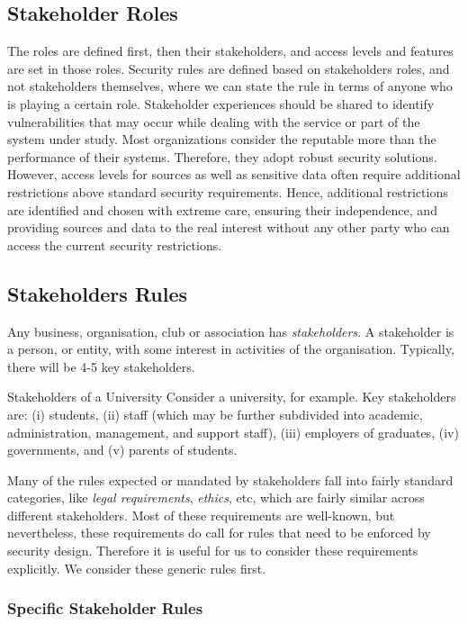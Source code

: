 \subsection{Stakeholder Roles}\label{strol}
The roles are defined first, then their stakeholders, and access levels and features are set in those roles. Security rules are defined based on stakeholders roles, and not stakeholders themselves, where we can state the rule in terms of anyone who is playing a certain role. Stakeholder experiences should be shared to identify vulnerabilities that may occur while dealing with the service or part of the system under study. Most organizations consider the reputable more than the performance of their systems. Therefore, they adopt robust security solutions. However, access levels for sources as well as sensitive data often require additional restrictions above standard security requirements. Hence,  additional restrictions are identified and chosen with extreme care, ensuring their independence, and providing sources and data to the real interest without any other party who can access the current security restrictions.
\subsection{Stakeholders Rules}

Any business, organisation, club or association has {\em stakeholders}. A stakeholder is a person, or 
entity, with some interest in activities of the organisation. Typically, there will be 4-5 key stakeholders.

\begin{example}{Stakeholders of a University}%
Consider a university, for example. Key stakeholders are: (i) students, (ii) staff (which may be further
subdivided into academic, administration, management, and support staff), (iii) employers of graduates,
(iv) governments, and (v) parents of students.
\end{example}

Many of the rules expected or mandated by stakeholders fall into fairly standard categories, like
{\em legal requirements}, {\em ethics}, etc, which are fairly similar across different stakeholders.
Most of these requirements are well-known, but nevertheless, these requirements do call for 
rules that need to be enforced by security design. Therefore it is useful for us to consider these
requirements explicitly. We consider these generic rules first.

\subsubsection{Specific Stakeholder Rules}

